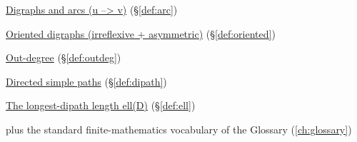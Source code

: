 \begin{closurepanel}
\item \hyperref[def:arc]{Digraphs and arcs (u --> v)} (\S\ref*{def:arc})
\item \hyperref[def:oriented]{Oriented digraphs (irreflexive + asymmetric)} (\S\ref*{def:oriented})
\item \hyperref[def:outdeg]{Out-degree} (\S\ref*{def:outdeg})
\item \hyperref[def:dipath]{Directed simple paths} (\S\ref*{def:dipath})
\item \hyperref[def:ell]{The longest-dipath length ell(D)} (\S\ref*{def:ell})
\item plus the standard finite-mathematics vocabulary of the Glossary (\cref{ch:glossary})
\end{closurepanel}
